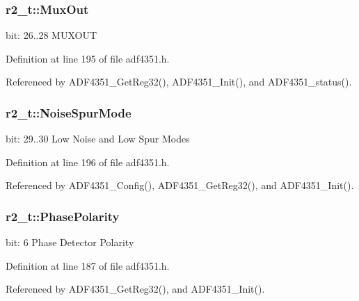 \subsubsection[{\texorpdfstring{Mux\+Out}{MuxOut}}]{ r2\+\_\+t\+::\+Mux\+Out}\hypertarget{structr2__t_a284292bd7e449b3c4641639ed6826310}{}\label{structr2__t_a284292bd7e449b3c4641639ed6826310}
bit\+: 26..28 M\+U\+X\+O\+UT 

Definition at line 195 of file adf4351.\+h.



Referenced by A\+D\+F4351\+\_\+\+Get\+Reg32(), A\+D\+F4351\+\_\+\+Init(), and A\+D\+F4351\+\_\+status().

\subsubsection[{\texorpdfstring{Noise\+Spur\+Mode}{NoiseSpurMode}}]{ r2\+\_\+t\+::\+Noise\+Spur\+Mode}\hypertarget{structr2__t_a40bc8b8cb7d9e77e57abd0e8be4f01af}{}\label{structr2__t_a40bc8b8cb7d9e77e57abd0e8be4f01af}
bit\+: 29..30 Low Noise and Low Spur Modes 

Definition at line 196 of file adf4351.\+h.



Referenced by A\+D\+F4351\+\_\+\+Config(), A\+D\+F4351\+\_\+\+Get\+Reg32(), and A\+D\+F4351\+\_\+\+Init().

\subsubsection[{\texorpdfstring{Phase\+Polarity}{PhasePolarity}}]{ r2\+\_\+t\+::\+Phase\+Polarity}\hypertarget{structr2__t_a05ebd4a6ece2e0641678b20f162e08ab}{}\label{structr2__t_a05ebd4a6ece2e0641678b20f162e08ab}
bit\+: 6 Phase Detector Polarity 

Definition at line 187 of file adf4351.\+h.



Referenced by A\+D\+F4351\+\_\+\+Get\+Reg32(), and A\+D\+F4351\+\_\+\+Init().

